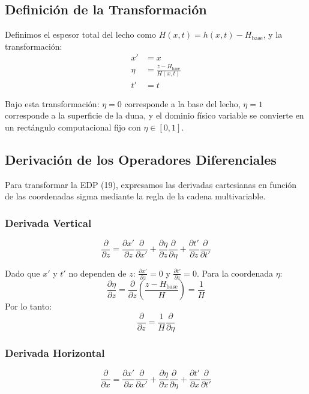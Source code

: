 \documentclass[11pt,a4paper]{article}
\begin{document}
\subsection{Definición de la Transformación}
Definimos el espesor total del lecho como $H(x,t) = h(x,t) - H_{\text{base}}$, y la transformación:
\begin{align}
    x' &= x \\
    \eta &= \frac{z - H_{\text{base}}}{H(x,t)} \\
    t' &= t
\end{align}

Bajo esta transformación: $\eta = 0$ corresponde a la base del lecho, $\eta = 1$ corresponde a la superficie de la duna, y el dominio físico variable se convierte en un rectángulo computacional fijo con $\eta \in [0, 1]$.

\subsection{Derivación de los Operadores Diferenciales}
Para transformar la EDP (19), expresamos las derivadas cartesianas en función de las coordenadas sigma mediante la regla de la cadena multivariable.

\subsubsection{Derivada Vertical}
\begin{equation}
    \frac{\partial}{\partial z} = \frac{\partial x'}{\partial z}\frac{\partial}{\partial x'} + \frac{\partial \eta}{\partial z}\frac{\partial}{\partial \eta} + \frac{\partial t'}{\partial z}\frac{\partial}{\partial t'}
\end{equation}

Dado que $x'$ y $t'$ no dependen de $z$: $\frac{\partial x'}{\partial z} = 0$ y $\frac{\partial t'}{\partial z} = 0$. Para la coordenada $\eta$:
\begin{equation}
    \frac{\partial \eta}{\partial z} = \frac{\partial}{\partial z}\left(\frac{z - H_{\text{base}}}{H}\right) = \frac{1}{H}
\end{equation}
Por lo tanto:
\begin{equation}
    \boxed{\frac{\partial}{\partial z} = \frac{1}{H}\frac{\partial}{\partial \eta}}
\end{equation}

\subsubsection{Derivada Horizontal}
\begin{equation}
    \frac{\partial}{\partial x} = \frac{\partial x'}{\partial x}\frac{\partial}{\partial x'} + \frac{\partial \eta}{\partial x}\frac{\partial}{\partial \eta} + \frac{\partial t'}{\partial x}\frac{\partial}{\partial t'}
\end{equation}
\end{document}
